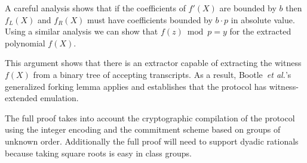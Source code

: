 \documentclass{article}
\theoremstyle{definition}
\begin{document}
A careful analysis shows that if the coefficients of $f'(X)$ are bounded by $b$ then $f_L(X)$ and $f_R(X)$ must have coefficients bounded by $b \cdot p$ in absolute value. Using a similar analysis we can show that $f(z)\bmod p=y$ for the extracted polynomial $f(X)$.

This argument shows that there is an extractor capable of extracting the witness $f(X)$ from a binary tree of accepting transcripts. As a result, Bootle~\emph{et al.}'s generalized forking lemma applies and establishes that the protocol has witness-extended emulation.

The full proof takes into account the cryptographic compilation of the protocol using the integer encoding and the commitment scheme based on groups of unknown order. Additionally the full proof will need to support dyadic rationals because taking square roots is easy in class groups.
\end{document}

